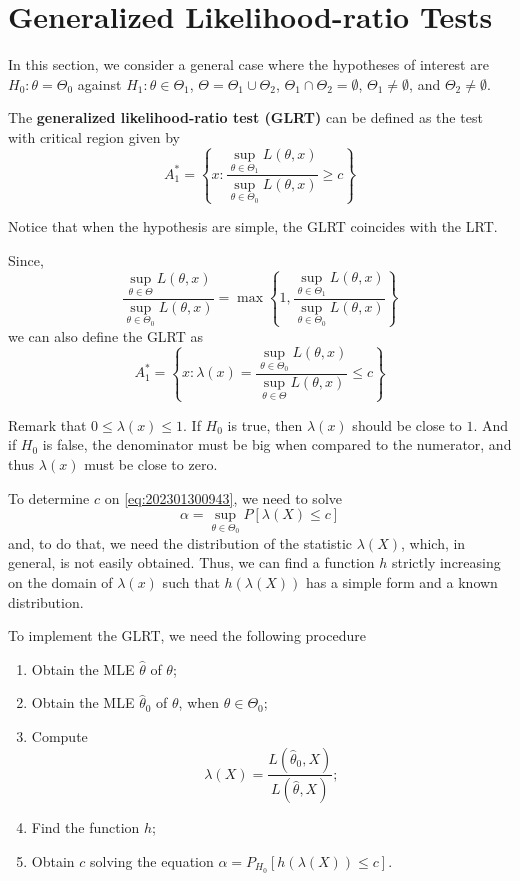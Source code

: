 \documentclass[12pt,a4paper]{report}
\begin{document}
\section{Generalized Likelihood-ratio Tests}

In this section, we consider a general case where the hypotheses of interest are $H_0: \theta = \Theta_0$ against $H_1 : \theta \in \Theta_1$, $\Theta = \Theta_1 \cup \Theta_2$, $\Theta_1 \cap \Theta_2 = \emptyset$, $\Theta_1 \neq \emptyset$, and $\Theta_2 \neq \emptyset$.

The \textbf{generalized likelihood-ratio test (GLRT)} can be defined as the test with critical region given by 
\[
    A_1^\ast = \left\{ x : \frac{\sup_{\theta \in \Theta_1} L(\theta, x)}{\sup_{\theta \in \Theta_0} L(\theta, x)} \geq c \right\}
\]

Notice that when the hypothesis are simple, the GLRT coincides with the LRT. 

Since, 
\[
    \frac{\sup_{\theta \in \Theta} L(\theta, x)}{\sup_{\theta \in \Theta_0} L(\theta, x)} = \max \left\{ 1, \frac{\sup_{\theta \in \Theta_1} L(\theta, x)}{\sup_{\theta \in \Theta_0} L(\theta, x)} \right\}
\]
we can also define the GLRT as 
\begin{equation}\label{eq:202301300943}
    A_1^\ast = \left\{ x : \lambda(x) = \frac{\sup_{\theta \in \Theta_0} L(\theta, x)}{\sup_{\theta \in \Theta} L(\theta, x)} \leq c \right\}
\end{equation}

Remark that $0 \leq \lambda(x) \leq 1$. If $H_0$ is true, then $\lambda(x)$ should be close to $1$. And if $H_0$ is false, the denominator must be big when compared to the numerator, and thus $\lambda(x)$ must be close to zero. 

To determine $c$ on \eqref{eq:202301300943}, we need to solve 
\[
    \alpha = \sup_{\theta \in \Theta_0} P[\lambda(X) \leq c]
\]
and, to do that, we need the distribution of the statistic $\lambda(X)$, which, in general, is not easily obtained. Thus, we can find a function $h$ strictly increasing on the domain of $\lambda(x)$ such that $h(\lambda(X))$ has a simple form and a known distribution. 

To implement the GLRT, we need the following procedure 
\begin{enumerate}
    \item Obtain the MLE $\hat{\theta}$ of $\theta$;
    \item Obtain the MLE $\hat{\theta}_0$ of $\theta$, when $\theta \in \Theta_0$; 
    \item Compute \[ \lambda(X) = \frac{L(\hat{\theta}_0, X)}{L(\hat{\theta}, X)}; \]
    \item Find the function $h$; 
    \item Obtain $c$ solving the equation $\alpha = P_{H_0} [ h(\lambda(X)) \leq c]$.
\end{enumerate}
\end{document}
